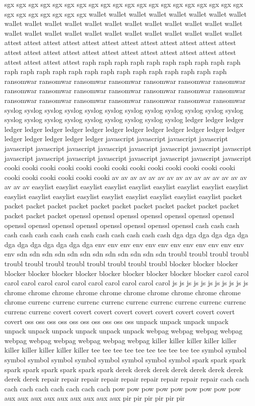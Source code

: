 \documentclass[conference]{IEEEtran}
\begin{document}
sgx sgx sgx sgx sgx sgx sgx sgx sgx sgx sgx sgx sgx sgx sgx sgx sgx sgx sgx sgx sgx sgx sgx sgx sgx sgx sgx wallet wallet wallet wallet wallet wallet wallet wallet wallet wallet wallet wallet wallet wallet wallet wallet wallet wallet wallet wallet wallet wallet wallet wallet wallet wallet wallet wallet wallet wallet wallet wallet attest attest attest attest attest attest attest attest attest attest attest attest attest attest attest attest attest attest attest attest attest attest attest attest attest attest attest attest raph raph raph raph raph raph raph raph raph raph raph raph raph raph raph raph raph raph raph raph raph raph raph raph ransomwar ransomwar ransomwar ransomwar ransomwar ransomwar ransomwar ransomwar ransomwar ransomwar ransomwar ransomwar ransomwar ransomwar ransomwar ransomwar ransomwar ransomwar ransomwar ransomwar ransomwar syslog syslog syslog syslog syslog syslog syslog syslog syslog syslog syslog syslog syslog syslog syslog syslog syslog syslog syslog syslog syslog ledger ledger ledger ledger ledger ledger ledger ledger ledger ledger ledger ledger ledger ledger ledger ledger ledger ledger ledger ledger javascript javascript javascript javascript javascript javascript javascript javascript javascript javascript javascript javascript javascript javascript javascript javascript javascript javascript javascript javascript cooki cooki cooki cooki cooki cooki cooki cooki cooki cooki cooki cooki cooki cooki cooki cooki cooki cooki cooki av av av av av av av av av av av av av av av av av av easylist easylist easylist easylist easylist easylist easylist easylist easylist easylist easylist easylist easylist easylist easylist easylist easylist easylist packet packet packet packet packet packet packet packet packet packet packet packet packet packet packet openssl openssl openssl openssl openssl openssl openssl openssl openssl openssl openssl openssl openssl openssl openssl cash cash cash cash cash cash cash cash cash cash cash cash cash cash dga dga dga dga dga dga dga dga dga dga dga dga dga env env env env env env env env env env env env env sdn sdn sdn sdn sdn sdn sdn sdn sdn sdn sdn sdn troubl troubl troubl troubl troubl troubl troubl troubl troubl troubl troubl troubl blocker blocker blocker blocker blocker blocker blocker blocker blocker blocker blocker blocker carol carol carol carol carol carol carol carol carol carol carol carol js js js js js js js js js js js chrome chrome chrome chrome chrome chrome chrome chrome chrome chrome chrome currenc currenc currenc currenc currenc currenc currenc currenc currenc currenc currenc covert covert covert covert covert covert covert covert covert covert oss oss oss oss oss oss oss oss oss oss unpack unpack unpack unpack unpack unpack unpack unpack unpack unpack webpag webpag webpag webpag webpag webpag webpag webpag webpag webpag killer killer killer killer killer killer killer killer killer killer tee tee tee tee tee tee tee tee tee tee symbol symbol symbol symbol symbol symbol symbol symbol symbol symbol spark spark spark spark spark spark spark spark spark derek derek derek derek derek derek derek derek derek repair repair repair repair repair repair repair repair repair cach cach cach cach cach cach cach cach cach pow pow pow pow pow pow pow pow pow aux aux aux aux aux aux aux aux aux pir pir pir pir pir pir 
\end{document}
